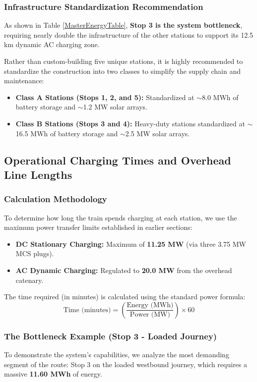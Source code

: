 \subsubsection*{Infrastructure Standardization Recommendation}
As shown in Table \ref{MasterEnergyTable}, \textbf{Stop 3 is the system bottleneck}, requiring nearly double the infrastructure of the other stations to support its 12.5 km dynamic AC charging zone. 

Rather than custom-building five unique stations, it is highly recommended to standardize the construction into two classes to simplify the supply chain and maintenance:
\begin{itemize}
    \item \textbf{Class A Stations (Stops 1, 2, and 5):} Standardized at $\sim$8.0 MWh of battery storage and $\sim$1.2 MW solar arrays.
    \item \textbf{Class B Stations (Stops 3 and 4):} Heavy-duty stations standardized at $\sim$16.5 MWh of battery storage and $\sim$2.5 MW solar arrays.
\end{itemize}


\subsection{Operational Charging Times and Overhead Line Lengths}

\subsubsection*{Calculation Methodology}
To determine how long the train spends charging at each station, we use the maximum power transfer limits established in earlier sections:
\begin{itemize}
    \item \textbf{DC Stationary Charging:} Maximum of \textbf{11.25 MW} (via three 3.75 MW MCS plugs).
    \item \textbf{AC Dynamic Charging:} Regulated to \textbf{20.0 MW} from the overhead catenary.
\end{itemize}

The time required (in minutes) is calculated using the standard power formula:
$$ \text{Time (minutes)} = \left( \frac{\text{Energy (MWh)}}{\text{Power (MW)}} \right) \times 60 $$

\subsubsection*{The Bottleneck Example (Stop 3 - Loaded Journey)}
To demonstrate the system's capabilities, we analyze the most demanding segment of the route: Stop 3 on the loaded westbound journey, which requires a massive \textbf{11.60 MWh} of energy. 

